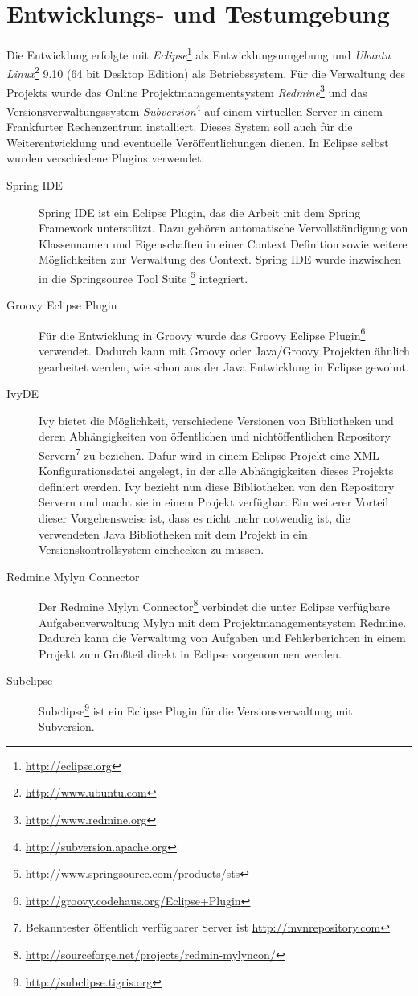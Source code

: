 \label{ch:final}

\section{Entwicklungs- und Testumgebung}
Die Entwicklung erfolgte mit \emph{Eclipse}\footnote{\url{http://eclipse.org}}
als Entwicklungsumgebung und \emph{Ubuntu
Linux}\footnote{\url{http://www.ubuntu.com}} 9.10 (64 bit Desktop Edition) als
Betriebssystem. Für die Verwaltung des Projekts wurde das Online
Projektmanagementsystem \emph{Redmine}\footnote{\url{http://www.redmine.org}} und
das Versionsverwaltungssystem
\emph{Subversion}\footnote{\url{http://subversion.apache.org}} auf einem
virtuellen Server in einem Frankfurter Rechenzentrum installiert. Dieses System
soll auch für die Weiterentwicklung und eventuelle Veröffentlichungen dienen. In
Eclipse selbst wurden verschiedene Plugins verwendet:
\begin{description}
  \item[Spring IDE] Spring IDE ist ein Eclipse Plugin, das die Arbeit mit dem
  Spring Framework unterstützt. Dazu gehören automatische Vervollständigung von
  Klassennamen und Eigenschaften in einer Context Definition sowie weitere
  Möglichkeiten zur Verwaltung des Context. Spring IDE wurde inzwischen in die
  Springsource Tool Suite
  \footnote{\url{http://www.springsource.com/products/sts}} integriert.
  \item[Groovy Eclipse Plugin] Für die Entwicklung in Groovy wurde das Groovy
  Eclipse Plugin\footnote{\url{http://groovy.codehaus.org/Eclipse+Plugin}}
  verwendet. Dadurch kann mit Groovy oder Java/Groovy Projekten ähnlich
  gearbeitet werden, wie schon aus der Java Entwicklung in Eclipse gewohnt.
  \item[IvyDE] Ivy bietet die Möglichkeit, verschiedene Versionen von
  Bibliotheken und deren Abhängigkeiten von öffentlichen und nichtöffentlichen
  Repository Servern\footnote{Bekanntester öffentlich verfügbarer Server ist
  \url{http://mvnrepository.com}} zu beziehen. Dafür wird in einem Eclipse
  Projekt eine \ac{XML} Konfigurationsdatei angelegt, in der alle
  Abhängigkeiten dieses Projekts definiert werden. Ivy bezieht nun diese
  Bibliotheken von den Repository Servern und macht sie in einem Projekt
  verfügbar. Ein weiterer Vorteil dieser Vorgehensweise ist, dass es
  nicht mehr notwendig ist, die verwendeten Java Bibliotheken mit dem Projekt in
  ein Versionskontrollsystem einchecken zu müssen.
  \item[Redmine Mylyn Connector] Der Redmine Mylyn
  Connector\footnote{\url{http://sourceforge.net/projects/redmin-mylyncon/}}
  verbindet die unter Eclipse verfügbare Aufgabenverwaltung Mylyn mit dem
  Projektmanagementsystem Redmine. Dadurch kann die Verwaltung von Aufgaben und
  Fehlerberichten in einem Projekt zum Großteil direkt in Eclipse vorgenommen
  werden.
  \item[Subclipse] Subclipse\footnote{\url{http://subclipse.tigris.org}} ist ein
  Eclipse Plugin für die Versionsverwaltung mit Subversion.
\end{description}

